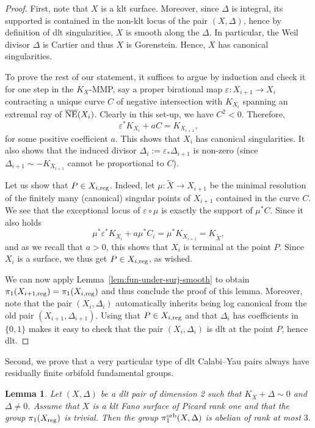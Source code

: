 \documentclass{amsart}
\newtheorem{lemma}[theorem]{Lemma}
\theoremstyle{definition}
\theoremstyle{remark}
\numberwithin{equation}{section}
\begin{document}
\begin{proof}
First, note that $X$ is a klt surface. Moreover, since $\Delta$ is integral, its supported is contained in the non-klt locus of the pair $(X,\Delta)$, hence by definition of dlt singularities, $X$ is smooth along the $\Delta$. In particular, the Weil divisor $\Delta$ is Cartier and thus $X$ is Gorenstein. Hence, $X$ has canonical singularities. 

To prove the rest of our statement, it suffices to argue by induction and check it for one step in the $K_X$-MMP, say a proper birational map
$\varepsilon:X_{i+1}\to X_i$ contracting a unique curve $C$ of negative intersection with $K_{X_i}$ spanning an extremal ray of $\overline{{\rm NE}}(X_i)$. Clearly in this set-up, we have $C^2 < 0$.
Therefore,
$$\varepsilon^*K_{X_{i}}+aC = K_{X_{i+1}},$$
for some positive coefficient $a$. This shows that $X_i$ has canonical singularities. It also shows that the induced divisor $\Delta_i:=\varepsilon_*\Delta_{i+1}$ is non-zero (since $\Delta_{i+1}\sim -K_{X_{i+1}}$ cannot be proportional to $C$).

Let us show that $P\in X_{i,{\rm reg}}$. Indeed, let $\mu:\tilde{X}\to X_{i+1}$ be the minimal resolution of the finitely many (canonical) singular points of $X_{i+1}$ contained in the curve $C$. We see that the exceptional locus of $\varepsilon\circ\mu$ is exactly the support of $\mu^*C$. Since it also holds
$$\mu^*\varepsilon^*K_{X_{i}}+a\mu^*C_i = \mu^*K_{X_{i+1}} = K_{\tilde{X}},$$
and as we recall that $a>0$, this shows that $X_i$ is terminal at the point $P$. Since $X_i$ is a surface, we thus get $P\in X_{i,{\rm reg}}$, as wished.

We can now apply Lemma~\ref{lem:fun-under-surj-smooth} to obtain $
\pi_1(X_{i+1,{\rm reg}})=\pi_1(X_{i,{\rm reg}})$ and thus conclude the proof of this lemma. Moreover, note that the pair $(X_i,\Delta_i)$ automatically inherits being log canonical from the old pair $(X_{i+1},\Delta_{i+1})$. Using that $P\in X_{i,{\rm reg}}$ and that $\Delta_i$ has coefficients in $\{0,1\}$ makes it easy to check that the pair $(X_i,\Delta_i)$ is dlt at the point $P$, hence dlt.
\end{proof}

Second, we prove that a very particular type of dlt Calabi--Yau pairs always have residually finite orbifold fundamental groups.

\begin{lemma}\label{lem:rank-1-dP-Gor-with-simply-smooth-locus}
Let $(X,\Delta)$ be a dlt pair of dimension 2 such that $K_X+\Delta\sim 0$ and $\Delta\ne 0$.
Assume that $X$ is a klt Fano surface of Picard rank one and that the group $\pi_1(X_{\rm reg})$ is trivial.
Then the group $\pi_1^{\rm orb}(X,\Delta)$ is abelian of rank at most $3$.
\end{lemma}
\end{document}
